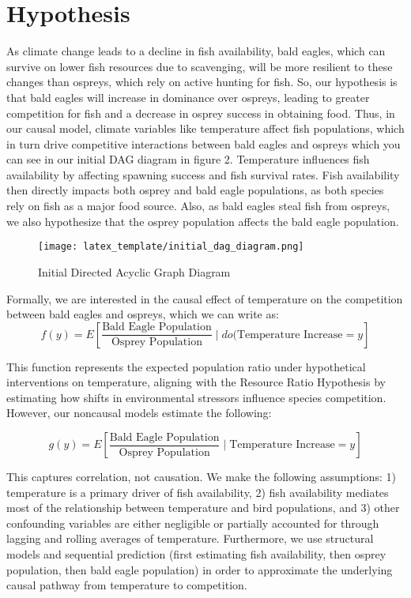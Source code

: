 \documentclass{article}
\begin{document}
\section{Hypothesis}
As climate change leads to a decline in fish availability, bald eagles, which can survive on lower fish resources due to scavenging, will be more resilient to these changes than ospreys, which rely on active hunting for fish. So, our hypothesis is that bald eagles will increase in dominance over ospreys, leading to greater competition for fish and a decrease in osprey success in obtaining food. Thus, in our causal model, climate variables like temperature affect fish populations, which in turn drive competitive interactions between bald eagles and ospreys which you can see in our initial DAG diagram in figure 2. Temperature influences fish availability by affecting spawning success and fish survival rates. Fish availability then directly impacts both osprey and bald eagle populations, as both species rely on fish as a major food source. Also, as bald eagles steal fish from ospreys, we also hypothesize that the osprey population affects the bald eagle population.

\begin{figure}[htbp]
\centerline{\texttt{[image: latex\_template/initial\_dag\_diagram.png]}}
\caption{Initial Directed Acyclic Graph Diagram}
\label{fig}
\end{figure} 

Formally, we are interested in the causal effect of temperature on the competition between bald eagles and ospreys, which we can write as:
\[
f(y) = E\left[\frac{\text{Bald Eagle Population}}{\text{Osprey Population}} \mid do(\text{Temperature Increase} = y\right]
\]

This function represents the expected population ratio under hypothetical interventions on temperature, aligning with the Resource Ratio Hypothesis by estimating how shifts in environmental stressors influence species competition. However, our noncausal models estimate the following:

\[
g(y) = {E}\left[\frac{\text{Bald Eagle Population}}{\text{Osprey Population}} \mid \text{Temperature Increase} = y\right]
\]

This captures correlation, not causation. We make the following assumptions: 1) temperature is a primary driver of fish availability, 2) fish availability mediates most of the relationship between temperature and bird populations, and 3) other confounding variables are either negligible or partially accounted for through lagging and rolling averages of temperature. Furthermore, we use structural models and sequential prediction (first estimating fish availability, then osprey population, then bald eagle population) in order to approximate the underlying causal pathway from temperature to competition. 
\end{document}
